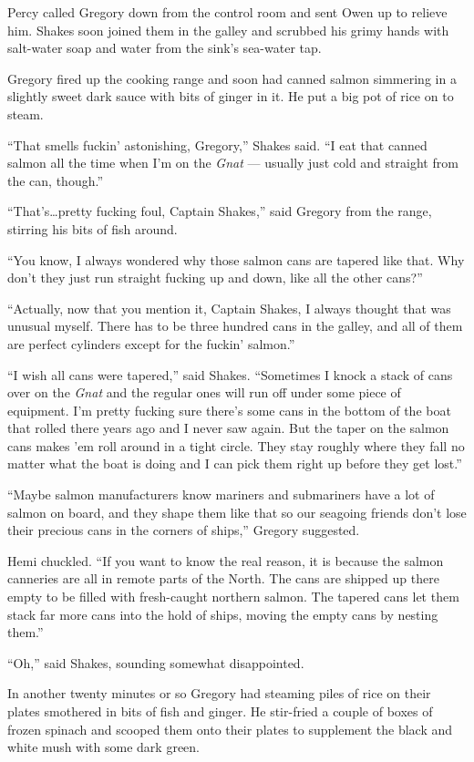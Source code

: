 \documentclass[
]{scrbook}
\begin{document}
\bigskip

Percy called Gregory down from the control room and sent Owen up to
relieve him. Shakes soon joined them in the galley and scrubbed his
grimy hands with salt-water soap and water from the sink's sea-water
tap.

Gregory fired up the cooking range and soon had canned salmon simmering
in a slightly sweet dark sauce with bits of ginger in it. He put a big
pot of rice on to steam.

``That smells fuckin' astonishing, Gregory,'' Shakes said. ``I eat that
canned salmon all the time when I'm on the \emph{Gnat} --- usually just
cold and straight from the can, though.''

``That's\ldots pretty fucking foul, Captain Shakes,'' said Gregory from
the range, stirring his bits of fish around.

``You know, I always wondered why those salmon cans are tapered like
that. Why don't they just run straight fucking up and down, like all the
other cans?''

``Actually, now that you mention it, Captain Shakes, I always thought
that was unusual myself. There has to be three hundred cans in the
galley, and all of them are perfect cylinders except for the fuckin'
salmon.''

``I wish all cans were tapered,'' said Shakes. ``Sometimes I knock a
stack of cans over on the \emph{Gnat} and the regular ones will run off
under some piece of equipment. I'm pretty fucking sure there's some cans
in the bottom of the boat that rolled there years ago and I never saw
again. But the taper on the salmon cans makes 'em roll around in a tight
circle. They stay roughly where they fall no matter what the boat is
doing and I can pick them right up before they get lost.''

``Maybe salmon manufacturers know mariners and submariners have a lot of
salmon on board, and they shape them like that so our seagoing friends
don't lose their precious cans in the corners of ships,'' Gregory
suggested.

Hemi chuckled. ``If you want to know the real reason, it is because the
salmon canneries are all in remote parts of the North. The cans are
shipped up there empty to be filled with fresh-caught northern salmon.
The tapered cans let them stack far more cans into the hold of ships,
moving the empty cans by nesting them.''

``Oh,'' said Shakes, sounding somewhat disappointed.

In another twenty minutes or so Gregory had steaming piles of rice on
their plates smothered in bits of fish and ginger. He stir-fried a
couple of boxes of frozen spinach and scooped them onto their plates to
supplement the black and white mush with some dark green.
\end{document}
